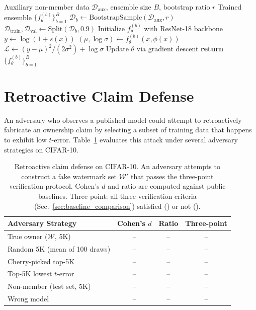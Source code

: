 \documentclass{article}
\newcommand{\cmark}{\ding{51}}
\newcommand{\xmark}{\ding{55}}
\begin{document}
\begin{algorithm}[h]
\caption{Gaussian Quantile Regression Training}
\label{alg:gaussian_qr}
\begin{algorithmic}
\REQUIRE Auxiliary non-member data $\mathcal{D}_{\text{aux}}$, ensemble size $B$, bootstrap ratio $r$
\ENSURE Trained ensemble $\{f_{\theta}^{(b)}\}_{b=1}^{B}$
    \STATE $\mathcal{D}_b \leftarrow \text{BootstrapSample}(\mathcal{D}_{\text{aux}}, r)$ 
    \STATE $\mathcal{D}_{\text{train}}, \mathcal{D}_{\text{val}} \leftarrow \text{Split}(\mathcal{D}_b, 0.9)$
    \STATE Initialize $f_{\theta}^{(b)}$ with ResNet-18 backbone
    \REPEAT
            \STATE $y \leftarrow \log(1 + s(x))$
            \STATE $(\mu, \log\sigma) \leftarrow f_{\theta}^{(b)}(x, \phi(x))$
            \STATE $\mathcal{L} \leftarrow (y - \mu)^2 / (2\sigma^2) + \log\sigma$
            \STATE Update $\theta$ via gradient descent
        \ENDFOR
\ENDFOR
\STATE \textbf{return} $\{f_{\theta}^{(b)}\}_{b=1}^{B}$
\end{algorithmic}
\end{algorithm}

\section{Retroactive Claim Defense}
\label{app:retroactive}

An adversary who observes a published model could attempt to
retroactively fabricate an ownership claim by selecting a subset of
training data that happens to exhibit low $t$-error.
Table~\ref{tab:retroactive} evaluates this attack under several
adversary strategies on CIFAR-10.

\begin{table}[h]
\caption{Retroactive claim defense on CIFAR-10.
An adversary attempts to construct a fake watermark set
$\mathcal{W}'$ that passes the three-point verification protocol.
Cohen's $d$ and ratio are computed against public baselines.
Three-point: all three verification criteria
(Sec.~\ref{sec:baseline_comparison}) satisfied (\cmark) or not (\xmark).}
\label{tab:retroactive}
\centering
\small
\begin{tabular}{@{}lccc@{}}
\toprule
Adversary Strategy & Cohen's $d$ & Ratio & Three-point \\
\midrule
True owner ($\mathcal{W}$, 5K) & -- & -- & -- \\
\addlinespace
Random 5K (mean of 100 draws) & -- & -- & -- \\
Cherry-picked top-5K & -- & -- & -- \\
Top-5K lowest $t$-error & -- & -- & -- \\
Non-member (test set, 5K) & -- & -- & -- \\
Wrong model & -- & -- & -- \\
\bottomrule
\end{tabular}
\end{table}
\end{document}
